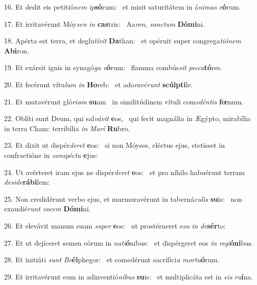 16. Et dedit eis petitió\textit{nem} \textit{ip}\textbf{só}rum: \ast\  et misit saturitátem in á\textit{ni}\textit{mas} \textit{e}\textbf{ó}rum.\

17. Et irritavérunt Móy\textit{sen} \textit{in} \textbf{cas}tris: \ast\  Aa\textit{ron}, \textit{sanc}\textit{tum} \textbf{Dó}\textbf{mi}ni.\

18. Apérta est terra, et deglu\textit{tí}\textit{vit} \textbf{Da}than: \ast\  et opéruit super congrega\textit{ti}\textit{ó}\textit{nem} \textbf{Ab}\textbf{i}ron.\

19. Et exársit ignis in synagó\textit{ga} \textit{e}\textbf{ó}rum: \ast\  flamma combús\textit{sit} \textit{pec}\textit{ca}\textbf{tó}res.\

20. Et fecérunt vítu\textit{lum} \textit{in} \textbf{Ho}reb: \ast\  et ado\textit{ra}\textit{vé}\textit{runt} \textbf{scúlp}\textbf{ti}le.\

21. Et mutavérunt gló\textit{ri}\textit{am} \textbf{su}am \ast\  in similitúdinem vítuli com\textit{e}\textit{dén}\textit{tis} \textbf{fœ}num.\

22. Oblíti sunt Deum, qui sal\textit{vá}\textit{vit} \textbf{e}os, \ast\  qui fecit magnália in Ægýpto, mirabília in terra Cham: terribília \textit{in} \textit{Ma}\textit{ri} \textbf{Ru}bro.\

23. Et dixit ut dispér\textit{de}\textit{ret} \textbf{e}os: \ast\  si non Móyses, eléctus ejus, stetísset in confractióne in \textit{con}\textit{spéc}\textit{tu} \textbf{e}jus:\

24. Ut avérteret iram ejus ne dispér\textit{de}\textit{ret} \textbf{e}os: \ast\  et pro níhilo habuérunt terram \textit{de}\textit{si}\textit{de}\textbf{rá}\textbf{bi}lem:\

25. Non credidérunt verbo ejus, et murmuravérunt in taberná\textit{cu}\textit{lis} \textbf{su}is: \ast\  non exaudié\textit{runt} \textit{vo}\textit{cem} \textbf{Dó}\textbf{mi}ni.\

26. Et elevávit manum suam \textit{su}\textit{per} \textbf{e}os: \ast\  ut prostérneret e\textit{os} \textit{in} \textit{de}\textbf{sér}to:\

27. Et ut dejíceret semen eórum in \textit{na}\textit{ti}\textbf{ó}nibus: \ast\  et dispérgeret eos \textit{in} \textit{re}\textit{gi}\textbf{ó}\textbf{ni}bus.\

28. Et initiáti \textit{sunt} \textit{Be}\textbf{él}phegor: \ast\  et comedérunt sacrifíci\textit{a} \textit{mor}\textit{tu}\textbf{ó}rum.\

29. Et irritavérunt eum in adinventió\textit{ni}\textit{bus} \textbf{su}is: \ast\  et multiplicáta est in \textit{e}\textit{is} \textit{ru}\textbf{í}na.\

